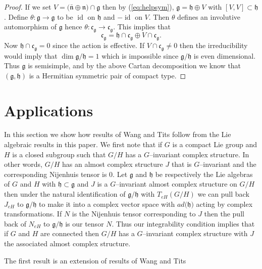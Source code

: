 \documentclass{amse-new}
\numberwithin{equation}{section} %
\begin{document}
\begin{proof}
If we set $V=\mathfrak{(\bar{n}\oplus \mathfrak{n)\cap \mathfrak{g}}}$ then by (\ref{eq:helpsym}), $%
\mathfrak{g}=\mathfrak{h}\oplus V$ with $[V,V]\subset \mathfrak{h}$. Define $%
\theta :\mathfrak{g}\rightarrow \mathfrak{g}$ to be $\operatorname{id}$ on $\mathfrak{h}$
and $-\operatorname{id}$ on $V$. Then $\theta $ defines an involutive automorphism of $%
\mathfrak{g}$ hence $\theta :\mathfrak{c}_{\mathfrak{g}}\rightarrow
\mathfrak{c}_{\mathfrak{g}}$. This implies that%
\[
\mathfrak{c}_{\mathfrak{g}}=\mathfrak{h}\cap \mathfrak{c}_{\mathfrak{g}%
}\oplus V\cap \mathfrak{c}_{\mathfrak{g}}\text{.}
\]%
Now $\mathfrak{h}\cap \mathfrak{c}_{\mathfrak{g}}=0$ since the action is
effective. If $V\cap \mathfrak{c}_{\mathfrak{g}}\neq 0$ then the
irreducibility would imply that $\dim \mathfrak{g}/\mathfrak{h}=1$ which is
impossible since $\mathfrak{g}/\mathfrak{h}$ is even dimensional. Thus $%
\mathfrak{g}$ is semisimple, and by the above  Cartan decomposition we know that $(\mathfrak{g}, \mathfrak{h})$
is a Hermitian symmetric pair of compact type.
\end{proof}

\section{Applications}

In this section we show how results of Wang and Tits follow from
the Lie algebraic results in this paper. We first note that if $G$ is a
compact Lie group and $H$ is a closed subgroup such that $G/H$ has a
$G$--invariant complex structure. In other words, $G/H$ has an almost complex
structure $J$ that is $G$--invariant and the corresponding Nijenhuis tensor is
$0$.  Let $\mathfrak{g}$ and $\mathfrak{h}$ be respectively the Lie algebras of
$G$ and $H$ with $\mathfrak{h}\subset\mathfrak{g}$ and $J$ is a $G$--invariant
almost complex structure on $G/H$ then under the natural identification of
$\mathfrak{g}/\mathfrak{h}$ with $T_{eH}(G/H)$  we can pull back $J_{eH}$ to
$\mathfrak{g}/\mathfrak{h}$ to make it into a complex vector space with
$ad(\mathfrak{h)}$ acting by complex transformations. If $N $ is the Nijenhuis
tensor corresponding to $J$ then the pull back of $N_{eH}$ to $\mathfrak{g}%
/\mathfrak{h}$ is our tensor $N$. Thus our integrability condition implies
that if $G$ and $H$ are connected then $G/H$ has a $G$--invariant complex
structure with $J$ the associated almost complex structure.

The first result is an extension of results of Wang \cite{Wang} and Tits
\cite{Tits}
\end{document}

